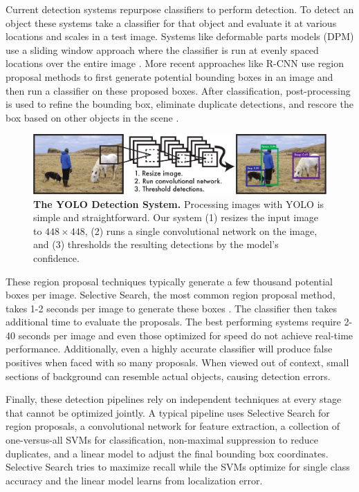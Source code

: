 \documentclass{article} %
\begin{document}
Current detection systems repurpose classifiers to perform detection. To detect an object these systems take a classifier for that object and evaluate it at various locations and scales in a test image. Systems like deformable parts models (DPM) use a sliding window approach where the classifier is run at evenly spaced locations over the entire image \cite{lsvm-pami}. More recent approaches like R-CNN use region proposal methods to first generate potential bounding boxes in an image and then run a classifier on these proposed boxes. After classification, post-processing is used to refine the bounding box, eliminate duplicate detections, and rescore the box based on other objects in the scene \cite{girshick2014rich}.

\begin{figure}[t]
\begin{center}
        \includegraphics[width=\linewidth]{system}
\end{center}
   \caption{\small \textbf{The YOLO Detection System.} Processing images with YOLO is simple and straightforward. Our system (1) resizes the input image to $448 \times 448$, (2) runs a single convolutional network on the image, and (3) thresholds the resulting detections by the model's confidence.}
\label{system}
\end{figure}

These region proposal techniques typically generate a few thousand potential boxes per image. Selective Search, the most common region proposal method, takes 1-2 seconds per image to generate these boxes \cite{uijlings2013selective}. The classifier then takes additional time to evaluate the proposals. The best performing systems require 2-40 seconds per image and even those optimized for speed do not achieve real-time performance. Additionally, even a highly accurate classifier will produce false positives when faced with so many proposals. When viewed out of context, small sections of background can resemble actual objects, causing detection errors.

Finally, these detection pipelines rely on independent techniques at every stage that cannot be optimized jointly. A typical pipeline uses Selective Search for region proposals, a convolutional network for feature extraction, a collection of one-versus-all SVMs for classification, non-maximal suppression to reduce duplicates, and a linear model to adjust the final bounding box coordinates. Selective Search tries to maximize recall while the SVMs optimize for single class accuracy and the linear model learns from localization error.
\end{document}
